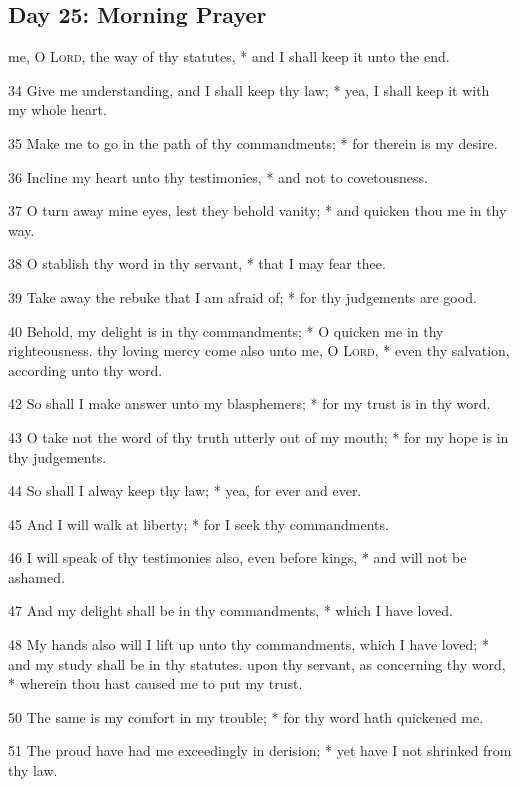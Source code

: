 \subsection{Day 25: Morning Prayer}
 me, O {\textsc{Lord}}, the way of thy statutes, * and I shall keep it unto the end.\par
34 Give me understanding, and I shall keep thy law; * yea, I shall keep it with my whole heart.\par
35 Make me to go in the path of thy commandments; * for therein is my desire.\par
36 Incline my heart unto thy testimonies, * and not to covetousness.\par
37 O turn away mine eyes, lest they behold vanity; * and quicken thou me in thy way.\par
38 O stablish thy word in thy servant, * that I may fear thee.\par
39 Take away the rebuke that I am afraid of; * for thy judgements are good.\par
40 Behold, my delight is in thy commandments; * O quicken me in thy righteousness.
 thy loving mercy come also unto me, O {\textsc{Lord}}, * even thy salvation, according unto thy word.\par
42 So shall I make answer unto my blasphemers; * for my trust is in thy word.\par
43 O take not the word of thy truth utterly out of my mouth; * for my hope is in thy judgements.\par
44 So shall I alway keep thy law; * yea, for ever and ever.\par
45 And I will walk at liberty; * for I seek thy commandments.\par
46 I will speak of thy testimonies also, even before kings, * and will not be ashamed.\par
47 And my delight shall be in thy commandments, * which I have loved.\par
48 My hands also will I lift up unto thy commandments, which I have loved; * and my study shall be in thy statutes.
 upon thy servant, as concerning thy word, * wherein thou hast caused me to put my trust.\par
50 The same is my comfort in my trouble; * for thy word hath quickened me.\par
51 The proud have had me exceedingly in derision; * yet have I not shrinked from thy law.\par
